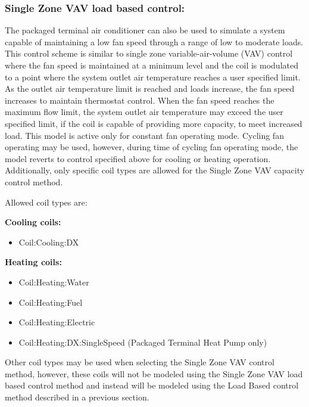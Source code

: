 \subsubsection{Single Zone VAV load based control:}\label{single-zone-vav-load-based-control}

The packaged terminal air conditioner can also be used to simulate a system capable of maintaining a low fan speed through a range of low to moderate loads. This control scheme is similar to single zone variable-air-volume (VAV) control where the fan speed is maintained at a minimum level and the coil is modulated to a point where the system outlet air temperature reaches a user specified limit. As the outlet air temperature limit is reached and loads increase, the fan speed increases to maintain thermostat control. When the fan speed reaches the maximum flow limit, the system outlet air temperature may exceed the user specified limit, if the coil is capable of providing more capacity, to meet increased load. This model is active only for constant fan operating mode. Cycling fan operating may be used, however, during time of cycling fan operating mode, the model reverts to control specified above for cooling or heating operation. Additionally, only specific coil types are allowed for the Single Zone VAV capacity control method.

Allowed coil types are:

\textbf{Cooling coils:}
\begin{itemize}
\item Coil:Cooling:DX
\end{itemize}

\textbf{Heating coils:}
\begin{itemize}
\item Coil:Heating:Water
\item Coil:Heating:Fuel
\item Coil:Heating:Electric
\item Coil:Heating:DX:SingleSpeed (Packaged Terminal Heat Pump only)
\end{itemize}

Other coil types may be used when selecting the Single Zone VAV control method, however, these coils will not be modeled using the Single Zone VAV load based control method and instead will be modeled using the Load Based control method described in a previous section.

